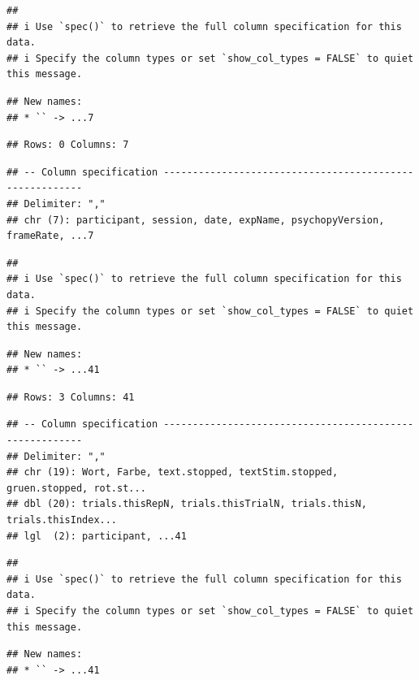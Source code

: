\documentclass[
]{book}
\begin{document}
\begin{verbatim}
## 
## i Use `spec()` to retrieve the full column specification for this data.
## i Specify the column types or set `show_col_types = FALSE` to quiet this message.
\end{verbatim}

\begin{verbatim}
## New names:
## * `` -> ...7
\end{verbatim}

\begin{verbatim}
## Rows: 0 Columns: 7
\end{verbatim}

\begin{verbatim}
## -- Column specification --------------------------------------------------------
## Delimiter: ","
## chr (7): participant, session, date, expName, psychopyVersion, frameRate, ...7
\end{verbatim}

\begin{verbatim}
## 
## i Use `spec()` to retrieve the full column specification for this data.
## i Specify the column types or set `show_col_types = FALSE` to quiet this message.
\end{verbatim}

\begin{verbatim}
## New names:
## * `` -> ...41
\end{verbatim}

\begin{verbatim}
## Rows: 3 Columns: 41
\end{verbatim}

\begin{verbatim}
## -- Column specification --------------------------------------------------------
## Delimiter: ","
## chr (19): Wort, Farbe, text.stopped, textStim.stopped, gruen.stopped, rot.st...
## dbl (20): trials.thisRepN, trials.thisTrialN, trials.thisN, trials.thisIndex...
## lgl  (2): participant, ...41
\end{verbatim}

\begin{verbatim}
## 
## i Use `spec()` to retrieve the full column specification for this data.
## i Specify the column types or set `show_col_types = FALSE` to quiet this message.
\end{verbatim}

\begin{verbatim}
## New names:
## * `` -> ...41
\end{verbatim}
\end{document}
